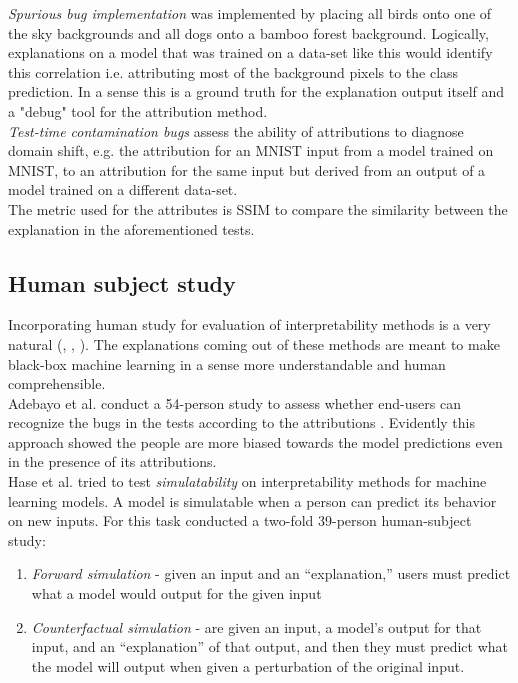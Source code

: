 \documentclass[12pt]{report}
\begin{document}
\textit{Spurious bug implementation} was implemented by placing all birds onto one of the sky backgrounds and all dogs onto a bamboo forest background. Logically, explanations on a model that was trained on a data-set like this would identify this correlation i.e. attributing most of the background pixels to the class prediction. In a sense this is a ground truth for the explanation output itself and a "debug" tool for the attribution method.\\

\textit{Test-time contamination bugs} assess the ability of attributions to diagnose domain shift, e.g. the attribution for an MNIST input from a model trained on MNIST, to an attribution for the same input but derived from an output of a model trained on a different data-set. \\


The metric used for the attributes is SSIM to compare the similarity between the explanation in the aforementioned tests.\\

\newpage


\subsection{Human subject study}

Incorporating  human study for evaluation of interpretability  methods is a very natural (\cite{DBLP:journals/corr/abs-2011-05429}, \cite{DBLP:journals/corr/abs-2005-01831}, \cite{DBLP:journals/corr/RibeiroSG16}).  The explanations coming out of these methods are meant to make black-box machine learning in a sense more understandable and human comprehensible. \\

Adebayo et al. \cite{DBLP:journals/corr/abs-2011-05429} conduct a 54-person study to assess whether end-users can recognize the bugs in the tests according to the attributions . Evidently this approach showed the people are more biased towards the model predictions even in the presence of its attributions. \\

Hase et al. \cite{DBLP:journals/corr/abs-2005-01831} tried to test \textit{simulatability} on interpretability methods for machine learning models. A model is simulatable when a person can predict
its behavior on new inputs. For this task \cite{DBLP:journals/corr/abs-2005-01831}  conducted a two-fold 39-person human-subject study:
\begin{enumerate}
	\item \textit{Forward simulation} - given an input and an “explanation,” users must predict what a model would output for the given input 
	\item \textit{Counterfactual simulation} - are given an input, a model’s output for that input, and an “explanation” of that output, and then they must predict what the model will output when given a perturbation of the original input.
\end{enumerate}
\end{document}
